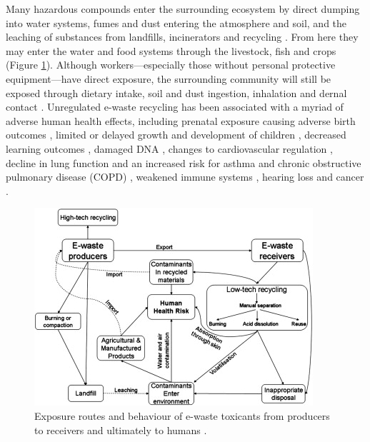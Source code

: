 \documentclass{article}
\begin{document}
Many hazardous compounds enter the surrounding ecosystem by direct dumping into water systems, fumes and dust entering the atmosphere and soil, and the leaching of substances from landfills, incinerators and recycling \cite{williams2011environmental}. From here they may enter the water and food systems through the livestock, fish and crops (Figure \ref{e-waste_ecosystem_contamination}). Although workers---especially those without personal protective equipment---have direct exposure, the surrounding community will still be exposed through dietary intake, soil and dust ingestion, inhalation and dernal contact  \cite{williams2011environmental, chan2013review}. Unregulated e-waste recycling has been associated with a myriad of adverse human health effects, including prenatal exposure causing adverse birth outcomes \cite{xu2012birth}, limited or delayed growth and development of children \cite{liu2018thyroid}, decreased learning outcomes \cite{soetrisno2020chronic}, damaged DNA \cite{alabi2012comparative}, changes to cardiovascular regulation \cite{cong2018elevated}, decline in lung function and an increased risk for asthma and chronic obstructive pulmonary disease (COPD) \cite{amoabeng2020effect}, weakened immune systems \cite{zhang2017alteration}, hearing loss \cite{xu2020hearing} and cancer \cite{davis2019strong}.

\begin{figure}[h]
    \includegraphics[width=.8 \textwidth]{./images/e-waste_ecosystem_contamination.jpg}
    \centering
    \caption{Exposure routes and behaviour of e-waste toxicants from producers to receivers and ultimately to humans \cite{robinson2009waste}.}
    \label{e-waste_ecosystem_contamination}
\end{figure}
\end{document}
